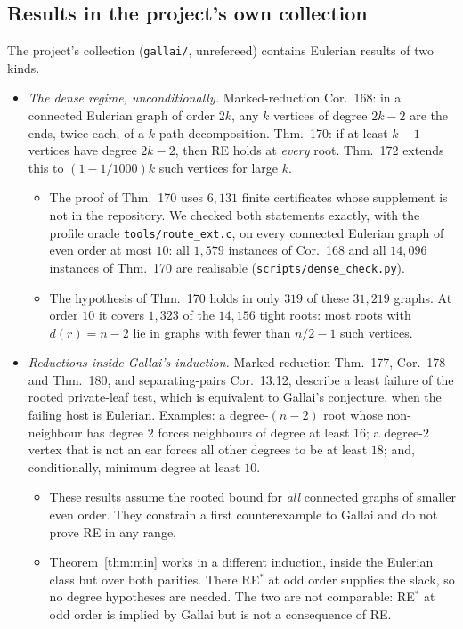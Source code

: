 \documentclass[11pt]{amsart}
\theoremstyle{definition}
\begin{document}
\subsection*{Results in the project's own collection}
The project's collection (\texttt{gallai/}, unrefereed) contains Eulerian results of two kinds.
\begin{itemize}[leftmargin=*]
\item \emph{The dense regime, unconditionally.} Marked-reduction Cor.~168: in a connected Eulerian
graph of order $2k$, any $k$ vertices of degree $2k-2$ are the ends, twice each, of a $k$-path
decomposition. Thm.~170: if at least $k-1$ vertices have degree $2k-2$, then RE holds at
\emph{every} root. Thm.~172 extends this to $(1-1/1000)k$ such vertices for large $k$.
\begin{itemize}
\item The proof of Thm.~170 uses $6{,}131$ finite certificates whose supplement is not in the
repository. We checked both statements exactly, with the profile oracle \texttt{tools/route\_ext.c},
on every connected Eulerian graph of even order at most $10$: all $1{,}579$ instances of Cor.~168 and
all $14{,}096$ instances of Thm.~170 are realisable (\texttt{scripts/dense\_check.py}).
\item The hypothesis of Thm.~170 holds in only $319$ of these $31{,}219$ graphs. At order $10$ it
covers $1{,}323$ of the $14{,}156$ tight roots: most roots with $d(r)=n-2$ lie in graphs with fewer
than $n/2-1$ such vertices.
\end{itemize}
\item \emph{Reductions inside Gallai's induction.} Marked-reduction Thm.~177, Cor.~178 and Thm.~180,
and separating-pairs Cor.~13.12, describe a least failure of the rooted private-leaf test, which is
equivalent to Gallai's conjecture, when the failing host is Eulerian. Examples: a degree-$(n-2)$ root
whose non-neighbour has degree $2$ forces neighbours of degree at least $16$; a degree-$2$ vertex that
is not an ear forces all other degrees to be at least $18$; and, conditionally, minimum degree at
least $10$.
\begin{itemize}
\item These results assume the rooted bound for \emph{all} connected graphs of smaller even order.
They constrain a first counterexample to Gallai and do not prove RE in any range.
\item Theorem~\ref{thm:min} works in a different induction, inside the Eulerian class but over both
parities. There RE$^*$ at odd order supplies the slack, so no degree hypotheses are needed. The two
are not comparable: RE$^*$ at odd order is implied by Gallai but is not a consequence of RE.
\end{itemize}
\end{itemize}
\end{document}

